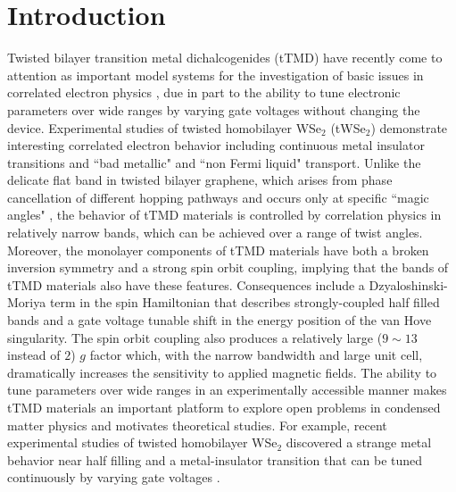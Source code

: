 \documentclass[%
reprint,
superscriptaddress,
twocolumn,
 amsmath,amssymb,
 aps,
 prb,
]{revtex4-2}
\newcommand{\twsetwo}{tWSe$_2$}
\begin{document}
\maketitle


\section{\label{introduction} Introduction}
Twisted bilayer transition metal dichalcogenides (tTMD) have recently come to attention as important model systems for the investigation of basic issues in correlated electron physics \cite{wu2018hubbard,tang2020simulation,PhysRevResearch.2.033087}, due in part to the ability to tune electronic parameters over wide ranges by varying gate voltages without changing the device.  Experimental studies of twisted homobilayer WSe$_2$ (\twsetwo) \cite{Wang:2020us,ghiotto2021quantum,Li21} demonstrate interesting correlated electron behavior including continuous metal insulator transitions and ``bad metallic" and ``non Fermi liquid" transport. Unlike the delicate flat band in twisted bilayer graphene, which arises from phase cancellation of different hopping pathways and occurs only at specific ``magic angles" \cite{Bistritzer11}, the behavior of tTMD materials is controlled by correlation physics in relatively narrow bands, which can be achieved over a range of twist angles. Moreover, the monolayer components of tTMD materials have both a broken inversion symmetry and a strong spin orbit coupling, implying that the bands of tTMD materials also have these features. Consequences include a Dzyaloshinski-Moriya term in the spin Hamiltonian that describes strongly-coupled half filled bands and a gate voltage tunable shift in the energy position of the van Hove singularity. The spin orbit coupling also produces a relatively large ($9\sim13$ instead of $2$) $g$ factor \cite{forste2020exciton, lindlau2018role} which, with the narrow bandwidth and large unit cell, dramatically increases the sensitivity to applied magnetic fields. The ability to tune parameters over wide ranges in an experimentally accessible manner makes tTMD materials an important platform to  explore open problems in condensed matter physics and motivates theoretical studies. For example, recent  experimental studies of twisted homobilayer WSe$_2$ discovered a strange metal behavior near half filling and a metal-insulator transition that can be tuned continuously by varying gate voltages \cite{ghiotto2021quantum,Li21}.
\end{document}
